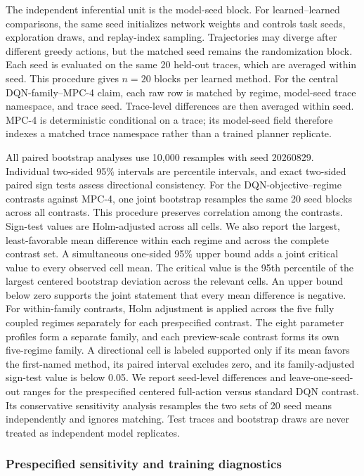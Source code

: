 \documentclass[remotesensing,article,submit,moreauthors]{Definitions/mdpi}
\begin{document}
The independent inferential unit is the model-seed block. For learned--learned comparisons, the same seed initializes network weights and controls task seeds, exploration draws, and replay-index sampling. Trajectories may diverge after different greedy actions, but the matched seed remains the randomization block. Each seed is evaluated on the same 20 held-out traces, which are averaged within seed. This procedure gives $n=20$ blocks per learned method. For the central DQN-family--MPC-4 claim, each raw row is matched by regime, model-seed trace namespace, and trace seed. Trace-level differences are then averaged within seed. MPC-4 is deterministic conditional on a trace; its model-seed field therefore indexes a matched trace namespace rather than a trained planner replicate.

All paired bootstrap analyses use 10,000 resamples with seed 20260829. Individual two-sided 95\% intervals are percentile intervals, and exact two-sided paired sign tests assess directional consistency. For the \DQNvsMPCContrastCount{} DQN-objective--regime contrasts against MPC-4, one joint bootstrap resamples the same 20 seed blocks across all contrasts. This procedure preserves correlation among the contrasts. Sign-test values are Holm-adjusted across all cells. We also report the largest, least-favorable mean difference within each regime and across the complete contrast set. A simultaneous one-sided 95\% upper bound adds a joint critical value to every observed cell mean. The critical value is the 95th percentile of the largest centered bootstrap deviation across the relevant cells. An upper bound below zero supports the joint statement that every mean difference is negative. For within-family contrasts, Holm adjustment is applied across the five fully coupled regimes separately for each prespecified contrast. The eight parameter profiles form a separate family, and each preview-scale contrast forms its own five-regime family. A directional cell is labeled supported only if its mean favors the first-named method, its paired interval excludes zero, and its family-adjusted sign-test value is below 0.05. We report seed-level differences and leave-one-seed-out ranges for the prespecified centered full-action versus standard DQN contrast. Its conservative sensitivity analysis resamples the two sets of 20 seed means independently and ignores matching. Test traces and bootstrap draws are never treated as independent model replicates.

\subsubsection{Prespecified sensitivity and training diagnostics}
\end{document}
